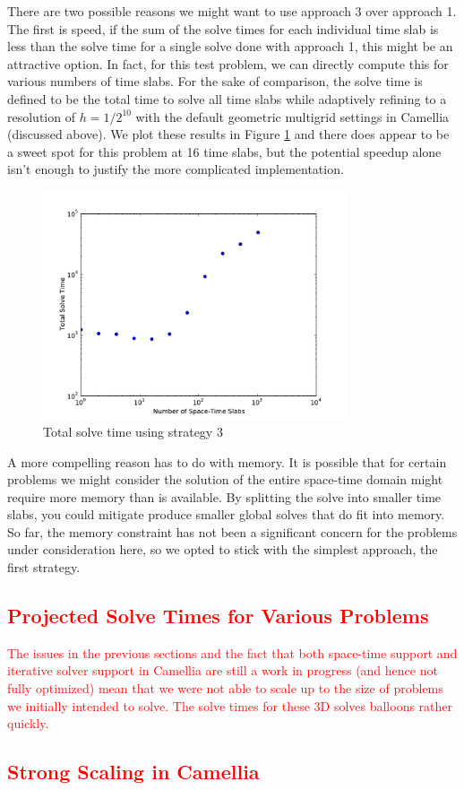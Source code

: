 \documentclass[Dissertation.tex]{subfiles}
\begin{document}
There are two possible reasons we might want to use approach 3 over approach 1.
The first is speed, if the sum of the solve times for each individual time slab is
less than the solve time for a single solve done with approach 1, this might be an
attractive option. In fact, for this test problem, we can directly compute this for
various numbers of time slabs. 
For the sake of comparison, the solve time is defined to be the total time to solve all
time slabs while adaptively refining to a resolution of $h=1/2^{10}$ 
with the default geometric multigrid settings in Camellia (discussed above).
We plot these results in Figure \ref{fig:TimeSlabSolveTime} and there does appear to be 
a sweet spot for this problem at 16 time slabs, but the potential speedup alone isn't 
enough to justify the more complicated implementation.
\begin{figure}
\centering
\includegraphics[width=0.8\textwidth]{Dissertation/Scaling/TimeSlabSolveTime.pdf}
\caption{Total solve time using strategy 3}
\label{fig:TimeSlabSolveTime}
\end{figure}

A more compelling reason has to do with memory. It is possible that for certain problems we might consider
the solution of the entire space-time domain might require more memory than is available.
By splitting the solve into smaller time slabs, you could mitigate produce smaller global solves that do 
fit into memory. So far, the memory constraint has not been a significant concern for the problems under
consideration here, so we opted to stick with the simplest approach, the first strategy.

\textcolor{red}{
\section{Projected Solve Times for Various Problems}
The issues in the previous sections and the fact that both space-time support and iterative solver support
in Camellia are still a work in progress (and hence not fully optimized) mean that we were not able to scale up to the size of problems we initially intended to solve.
The solve times for these 3D solves balloons rather quickly.
}

\textcolor{red}{
\section{Strong Scaling in Camellia}
}
\end{document}
